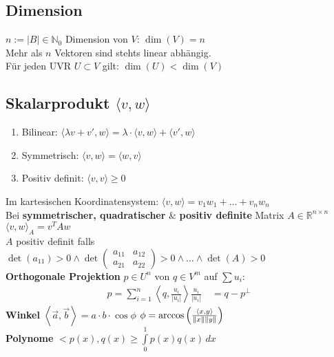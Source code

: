 \documentclass[6pt,a4paper]{scrartcl}
\newcommand{\R}{\ensuremath{\mathbb R}}
\newcommand{\enbrace}[1]{\ensuremath{\left(#1\right)}}
\newcommand{\norm}[2][\relax]{\ifx#1\relax \ensuremath{\left\Vert#2\right\Vert}\else \ensuremath{\left\Vert#2\right\Vert_{#1}}\fi}
\newcommand{\abs}[1]{\ensuremath{\left\vert#1\right\vert}}
\begin{document}
\begin{multicols}{3}
\subsection{Dimension}
$n:= \abs{B} \in \mathbb N_0$  Dimension von $V$: $\dim (V) = n$ \\
Mehr als $n$ Vektoren sind stehts linear abhängig. \\
Für jeden UVR $U \subset V$ gilt: $\dim (U) < \dim (V)$ 

\subsection{Skalarprodukt $\langle v,w \rangle$} 
\begin{enumerate}\itemsep0pt
	\item Bilinear: $\langle \lambda v+v',w \rangle=\lambda\cdot\langle v,w \rangle + \langle v',w \rangle$
	\item Symmetrisch: $\langle v,w \rangle=\langle w,v \rangle$
	\item Positiv definit: $\langle v,v \rangle\ge0$ 
\end{enumerate}  
Im kartesischen Koordinatensystem: $\langle v,w \rangle=v_1 w_1+…+v_n w_n$ \\
Bei \textbf{symmetrischer, quadratischer} \& \textbf{positiv definite} Matrix $A\in \R^{n\times n}$\\
$\langle v,w \rangle_A=v^T A w$\\
$A$ positiv definit falls $\det (a_{11}) > 0 \land \det \left(\begin{matrix} a_11 & a_12\\ a_21 & a_22\end{matrix}\right) > 0 \land … \land \det (A)>0$   \\
\textbf{Orthogonale Projektion} $p\in U^n$ von $q\in V^m$ auf $\sum u_i$:
\begin{eqnarray*}
	p=\sum_{i=1}^n \left\langle q, \frac{u_i}{\abs{u_i}}\right\rangle\frac{u_i}{\abs{u_i}} \quad = q - p^\perp
\end{eqnarray*} 
\textbf{Winkel} \quad 	$\left\langle \vec a, \vec b \right\rangle = a \cdot b \cdot \cos \phi$ \qquad
$\phi = \arccos \enbrace{ \frac{\left\langle x, y\right\rangle }{\norm{x} \norm{y} } }$\\
\textbf{Polynome} $<p(x),q(x)\geq\int\limits_{0}^{1}p(x)q(x)\,dx$


\end{multicols}
\end{document}
